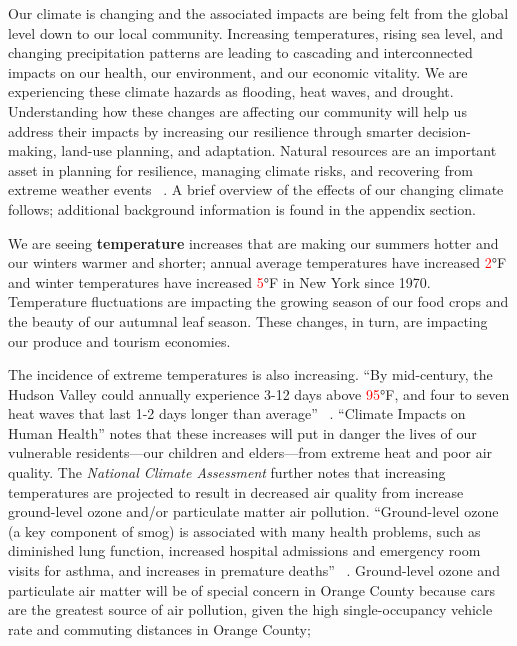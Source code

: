 Our climate is changing and the associated impacts are being felt from the 
global level down to our local community. Increasing temperatures, rising sea 
level, and changing precipitation patterns are leading to cascading and 
interconnected impacts on our health, our environment, and our economic 
vitality. We are experiencing these climate hazards as flooding, heat waves, 
and drought. Understanding how these changes are affecting our community will 
help us address their impacts by increasing our resilience through smarter 
decision-making, land-use planning, and adaptation. Natural resources are an 
important asset in planning for resilience, managing climate risks, and 
recovering from extreme weather events ~\citep{haeckel2014}. A brief overview of 
the effects of our changing climate follows; additional background information 
is found in the appendix section.
\par
We are seeing \textbf{temperature} increases that are making our summers hotter 
and our winters warmer and shorter; annual average temperatures have increased 
\textcolor{red}{2}$\si{\degree}$F and winter temperatures have increased 
\textcolor{red}{5}$\si{\degree}$F in New York since 1970. Temperature fluctuations 
are impacting the growing season of our food crops and the beauty of our 
autumnal leaf season. These changes, in turn, are impacting our produce and 
tourism economies.
\par
The incidence of extreme temperatures is also increasing. ``By mid-century, 
the Hudson Valley could annually experience 3-12 days above 
\textcolor{red}{95}$\si{\degree}$F, and four to seven heat waves that last 1-2 days 
longer than average'' ~\citep{Zemaitis2018}. ``Climate Impacts on Human Health'' 
notes that these increases will put in danger the lives of our vulnerable 
residents—our children and elders—from extreme heat and poor air quality. The 
\textit{National Climate Assessment} further notes that increasing temperatures 
are projected to result in decreased air quality from increase ground-level 
ozone and/or particulate matter air pollution. ``Ground-level ozone (a key 
component of smog) is associated with many health problems, such as diminished 
lung function, increased hospital admissions and emergency room visits for 
asthma, and increases in premature deaths'' ~\citep{melillo2014}. 
Ground-level ozone and particulate air matter will be of special concern in 
Orange County because cars are the greatest source of air pollution, given the 
high single-occupancy vehicle rate and commuting distances in Orange County; 
